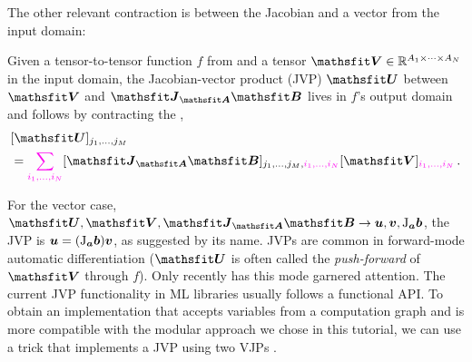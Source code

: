 The other relevant contraction is between the Jacobian and a vector from the input domain:

\begin{definition}\label{def:jvp}
  Given a tensor-to-tensor function $f$ from  and a tensor $\tV \in \sR^{A_1 \times \dots \times A_N}$ in the input domain, the Jacobian-vector product (JVP) $\tU$ between $\tV$ and $\tJ_{\tA}\tB$ lives in $f$'s output domain and follows by contracting the ,
  \begin{align*}
    & [\tU]_{j_1, \dots, j_M}
    \\
    & =
      \colored[VectorPink]{\sum_{i_1, \dots, i_N}}
      [\tJ_{\tA}\tB]_{j_1, \dots, j_M, \colored[VectorPink]{i_1, \dots, i_N}}
      [\tV]_{\colored[VectorPink]{i_1, \dots, i_N}}\,.
  \end{align*}
\end{definition}
For the vector case, $\tU, \tV, \tJ_{\tA}\tB \to \vu, \vv, \jac_{\va}\vb$, the JVP is ${\bm{u}} = (\mathrm{J}_{{\bm{a}}}{\bm{b}}) {\bm{v}}$, as suggested by its name.
JVPs are common in forward-mode automatic differentiation ($\tU$ is often called the \emph{push-forward} of $\tV$ through $f$).
Only recently has this mode garnered attention.
The current JVP functionality in ML libraries usually follows a functional API.
To obtain an implementation that accepts variables from a computation graph and is more compatible with the modular approach we chose in this tutorial, we can use a trick that implements a JVP using two VJPs \cite{townsend2017new}.


